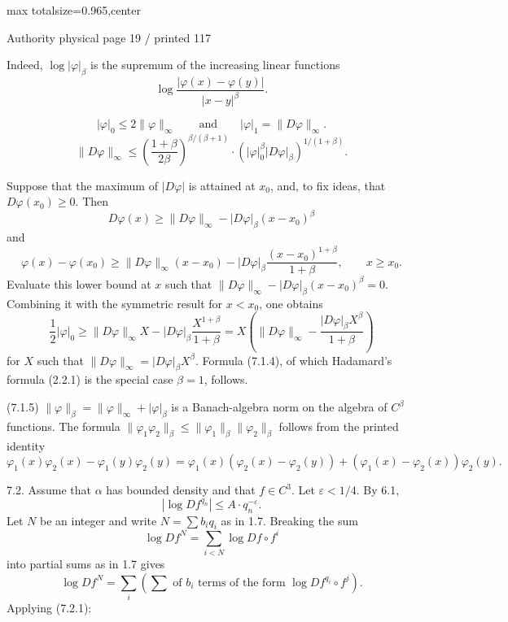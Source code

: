 \documentclass{article}
\begin{document}
\newpage
\noindent\begin{adjustbox}{max totalsize={\textwidth}{0.965\textheight},center}\begin{minipage}{\textwidth}
\noindent\hfill\scriptsize Authority physical page 19 / printed 117\par\normalsize
Indeed, \(\log|\varphi|_\beta\) is the supremum of the increasing linear functions
\[
\log\frac{|\varphi(x)-\varphi(y)|}{|x-y|^\beta}.
\]

\[
\tag{7.1.3}
|\varphi|_0\leq2\lVert\varphi\rVert_\infty
\qquad\text{and}\qquad
|\varphi|_1=\lVert D\varphi\rVert_\infty.
\]
\[
\tag{7.1.4}
\lVert D\varphi\rVert_\infty
\leq\left(\frac{1+\beta}{2\beta}\right)^{\beta/(\beta+1)}
\cdot\left(|\varphi|_0^\beta|D\varphi|_\beta\right)^{1/(1+\beta)}.
\]

Suppose that the maximum of \(|D\varphi|\) is attained at \(x_0\), and, to fix ideas, that \(D\varphi(x_0)\geq0\). Then
\[
D\varphi(x)\geq\lVert D\varphi\rVert_\infty-|D\varphi|_\beta(x-x_0)^\beta
\]
and
\[
\varphi(x)-\varphi(x_0)
\geq\lVert D\varphi\rVert_\infty(x-x_0)
-|D\varphi|_\beta\frac{(x-x_0)^{1+\beta}}{1+\beta},
\qquad x\geq x_0.
\]
Evaluate this lower bound at \(x\) such that \(\lVert D\varphi\rVert_\infty-|D\varphi|_\beta(x-x_0)^\beta=0\). Combining it with the symmetric result for \(x<x_0\), one obtains
\[
\frac12|\varphi|_0
\geq\lVert D\varphi\rVert_\infty X
-|D\varphi|_\beta\frac{X^{1+\beta}}{1+\beta}
=X\left(\lVert D\varphi\rVert_\infty-
\frac{|D\varphi|_\beta X^\beta}{1+\beta}\right)
\]
for \(X\) such that \(\lVert D\varphi\rVert_\infty=|D\varphi|_\beta X^\beta\). Formula (7.1.4), of which Hadamard’s formula (2.2.1) is the special case \(\beta=1\), follows.

(7.1.5) \(\lVert\varphi\rVert_\beta=\lVert\varphi\rVert_\infty+|\varphi|_\beta\) is a Banach-algebra norm on the algebra of \(C^\beta\) functions. The formula \(\lVert\varphi_1\varphi_2\rVert_\beta\leq\lVert\varphi_1\rVert_\beta\lVert\varphi_2\rVert_\beta\) follows from the printed identity
\[
\varphi_1(x)\varphi_2(x)-\varphi_1(y)\varphi_2(y)
=\varphi_1(x)(\varphi_2(x)-\varphi_2(y))
+(\varphi_1(x)-\varphi_2(x))\varphi_2(y).
\]

7.2. Assume that \(\alpha\) has bounded density and that \(f\in C^3\). Let \(\varepsilon<1/4\). By 6.1,
\[
\tag{7.2.1}
|\log Df^{q_n}|\leq A\cdot q_n^{-\varepsilon}.
\]
Let \(N\) be an integer and write \(N=\sum b_iq_i\) as in 1.7. Breaking the sum
\[
\log Df^N=\sum_{i<N}\log Df\circ f^i
\]
into partial sums as in 1.7 gives
\[
\tag{7.2.2}
\log Df^N=\sum_i\left(\sum\text{ of }b_i\text{ terms of the form }\log Df^{q_i}\circ f^j\right).
\]
Applying (7.2.1):
\end{minipage}\end{adjustbox}
\end{document}
